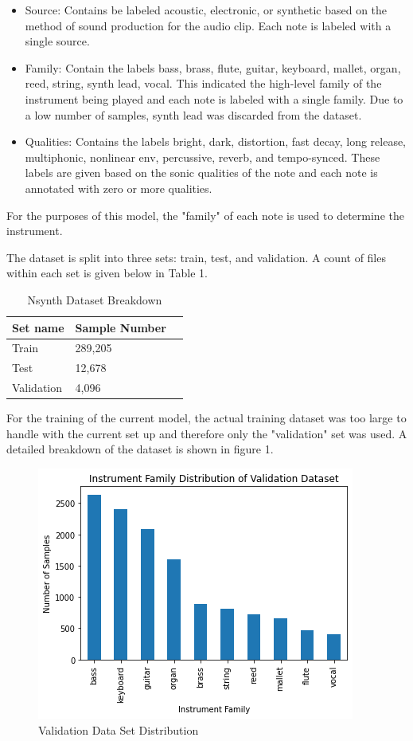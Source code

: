 \documentclass{article}
\begin{document}
\begin{itemize}
\item Source: Contains be labeled acoustic, electronic, or synthetic based on the method of sound production for the audio clip. Each note is labeled with a single source.
\item Family: Contain the labels bass, brass, flute, guitar, keyboard, mallet, organ, reed, string, synth lead, vocal. This indicated the high-level family of the instrument being played and each note is labeled with a single family. Due to a low number of samples, synth lead was discarded from the dataset.
\item Qualities: Contains the labels bright, dark, distortion, fast decay, long release, multiphonic, nonlinear env, percussive, reverb, and tempo-synced. These labels are given based on the sonic qualities of the note and each note is annotated with zero or more qualities.
\end{itemize}

For the purposes of this model, the "family" of each note is used to determine the instrument.

The dataset is split into three sets: train, test, and validation. A count of files within each set is given below in Table 1.

\begin{table}[htb]
  \caption{Nsynth Dataset Breakdown}
  \label{Nsynth-Dataset}
  \centering
  \begin{tabular}{lll}
    \toprule
    Set name & Sample Number \\
    \midrule
    Train & 289,205\\
    Test & 12,678 \\
    Validation & 4,096\\
    \bottomrule
  \end{tabular}
\end{table}

For the training of the current model, the actual training dataset was too large to handle with the current set up and therefore only the "validation" set was used. A detailed breakdown of the dataset is shown in figure 1.

\begin{figure}[htb]
  \centering
  \includegraphics[width=.5\linewidth]{validation_dataset}
  \caption{Validation Data Set Distribution}
\end{figure}
\end{document}
